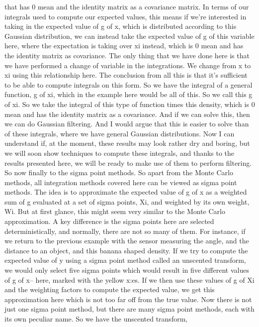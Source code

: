 that has 0 mean and the identity matrix as a covariance matrix.
In terms of our integrals used to compute our expected values,
this means if we're interested in taking
in the expected value of g of x, which is distributed according
to this Gaussian distribution, we can instead
take the expected value of g of this variable
here, where the expectation is taking over xi instead,
which is 0 mean and has the identity matrix as covariance.
The only thing that we have done here
is that we have performed a change of variable
in the integrations.
We change from x to xi using this relationship here.
The conclusion from all this is that it's
sufficient to be able to compute integrals on this form.
So we have the integral of a general function, g of xi,
which in the example here would be all of this.
So we call this g of xi.
So we take the integral of this type of function
times this density, which is 0 mean and has the identity
matrix as a covariance.
And if we can solve this, then we can do Gaussian filtering.
And I would argue that this is easier to solve
than of these integrals, where we have
general Gaussian distributions.
Now I can understand if, at the moment,
these results may look rather dry and boring,
but we will soon show techniques to compute these integrals,
and thanks to the results presented here,
we will be ready to make use of them to perform filtering.
So now finally to the sigma point methods.
So apart from the Monte Carlo methods,
all integration methods covered here
can be viewed as sigma point methods.
The idea is to approximate the expected value
of g of x as a weighted sum of g evaluated
at a set of sigma points, Xi, and weighted
by its own weight, Wi.
But at first glance, this might seem very similar to the Monte
Carlo approximation.
A key difference is the sigma points here
are selected deterministically, and normally, there
are not so many of them.
For instance, if we return to the previous example
with the sensor measuring the angle,
and the distance to an object, and this banana shaped density.
If we try to compute the expected value of y using
a sigma point method called an unscented transform,
we would only select five sigma points which would result
in five different values of g of x-- here,
marked with the yellow x:es.
If we then use these values of g of Xi and the weighting factors
to compute the expected value, we
get this approximation here which is not too far off
from the true value.
Now there is not just one sigma point method,
but there are many sigma point methods, each
with its own peculiar name.
So we have the unscented transform,
